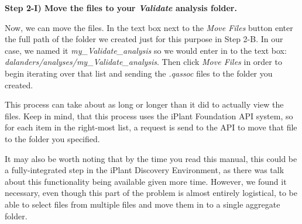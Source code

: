 \documentclass[twoside,a4paper]{refart}
\begin{document}
\begin{center}
\end{center}

\textbf{Step 2-I) Move the files to your \textit{Validate} analysis folder.}

Now, we can move the files. In the text box next to the \textit{Move Files} button enter the full path of the folder we created just for this purpose in Step 2-B. In our case, we named it \textit{my\_Validate\_analysis} so we would enter in to the text box: \textit{dalanders/analyses/my\_Validate\_analysis}. Then click \textit{Move Files} in order to begin iterating over that list and sending the \textit{.qassoc} files to the folder you created. 

This process can take about as long or longer than it did to actually view the files. Keep in mind, that this process uses the iPlant Foundation API system, so for each item in the right-most list, a request is send to the API to move that file to the folder you specified. 

It may also be worth noting that by the time you read this manual, this could be a fully-integrated step in the iPlant Discovery Environment, as there was talk about this functionality being available given more time. However, we found it necessary, even though this part of the problem is almost entirely logistical, to be able to select files from multiple files and move them in to a single aggregate folder. 
\end{document}
